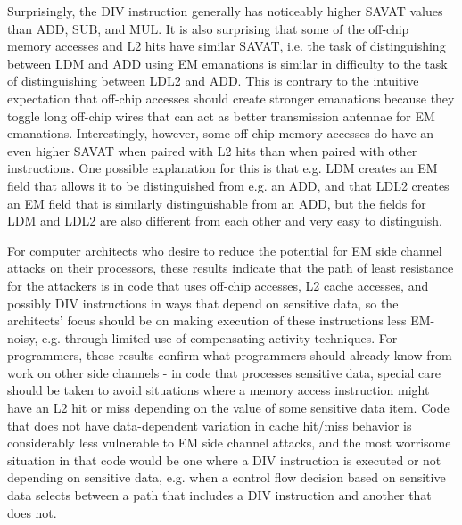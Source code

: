 Surprisingly, the DIV instruction generally has noticeably higher SAVAT values than ADD, SUB, and MUL. It is also surprising that some of the off-chip memory accesses and L2 hits have similar SAVAT, i.e. the task of distinguishing between LDM and ADD using EM emanations is similar in difficulty to the task of distinguishing between LDL2 and ADD. This is contrary to the intuitive expectation that off-chip accesses should create stronger emanations because they toggle long off-chip wires that can act as better transmission antennae for EM emanations. Interestingly, however, some off-chip memory accesses do have an even higher SAVAT when paired with L2 hits than when paired with other instructions. One possible explanation for this is that e.g. LDM creates an EM field that allows it to be distinguished from e.g. an ADD, and that LDL2 creates an EM field that is similarly distinguishable from an ADD, but the fields for LDM and LDL2 are also different from each other and very easy to distinguish.

For computer architects who desire to reduce the potential for EM side channel attacks on their processors, these results indicate that the path of least resistance for the attackers is in code that uses off-chip accesses, L2 cache accesses, and possibly DIV instructions in ways that depend on sensitive data, so the architects' focus should be on making execution of these instructions less EM-noisy, e.g. through limited use of compensating-activity techniques. For programmers, these results confirm what programmers should already know from work on other side channels - in code that processes sensitive data, special care should be taken to avoid situations where a memory access instruction might have an L2 hit or miss depending on the value of some sensitive data item. Code that does not have data-dependent variation in cache hit/miss behavior is considerably less vulnerable to EM side channel attacks, and the most worrisome situation in that code would be one where a DIV instruction is executed or not depending on sensitive data, e.g. when a control flow decision based on sensitive data selects between a path that includes a DIV instruction and another that does not.

